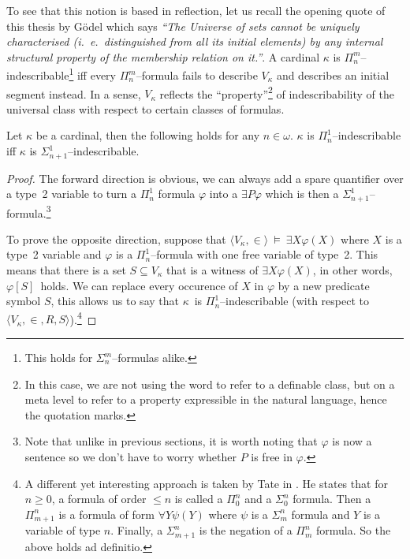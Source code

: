 To see that this notion is based in reflection, let us recall the opening quote of this thesis by Gödel which says \emph{``The Universe of sets cannot be uniquely characterised (i.~e.~distinguished from all its initial elements) by any internal structural property of the membership relation on it.''}. A cardinal $\kappa$ is $\Pi^m_n$–indescribable\footnote{This holds for $\Sigma^m_n$–formulas alike.} iff every $\Pi^m_n$–formula fails to describe $V_\kappa$ and describes an initial segment instead.
In a sense, $V_\kappa$ reflects the ``property''\footnote{In this case, we are not using the word to refer to a definable class, but on a meta level to refer to a property expressible in the natural language, hence the quotation marks.} of indescribability of the universal class with respect to certain classes of formulas.


\begin{lemma}
Let $\kappa$ be a cardinal, then the following holds for any $n \in \omega$. $\kappa$ is $\Pi^1_n$–indescribable iff $\kappa$ is $\Sigma^1_{n+1}$–indescribable.
\end{lemma}

\begin{proof}
The forward direction is obvious, we can always add a spare quantifier over a type~2 variable to turn a $\Pi^1_n$ formula $\varphi$ into a $\exists P \varphi$ which is then a $\Sigma^1_{n+1}$–formula.\footnote{Note that unlike in previous sections, it is worth noting that $\varphi$ is now a sentence so we don't have to worry whether $P$ is free in $\varphi$.}

To prove the opposite direction, suppose that $\langle V_\kappa, \in \rangle~\models~\exists X \varphi(X)$ where $X$ is a type~2 variable and $\varphi$ is a $\Pi^1_n$–formula with one free variable of type~2. 
This means that there is a set $S \subseteq V_\kappa$ that is a witness of $\exists X \varphi(X)$, in other words, $\varphi[S]$ holds. 
We can replace every occurence of $X$ in $\varphi$ by a new predicate symbol $S$, this allows us to say that $\kappa$ is $\Pi^1_n$–indescribable (with respect to $\langle V_\kappa, \in, R, S \rangle$).\footnote{A different yet interesting approach is taken by Tate in \cite{Tait_constructingcardinals}. He states that for $n\geq 0$, a formula of order $\leq n$ is called a $\Pi^n_0$ and a $\Sigma^n_0$ formula. Then a $\Pi^n_{m+1}$ is a formula of form $\forall Y \psi(Y)$ where $\psi$ is a $\Sigma^n_m$ formula and $Y$ is a variable of type $n$. Finally, a $\Sigma^n_{m+1}$ is the negation of a $\Pi^n_m$ formula. So the above holds ad definitio.}
\end{proof}

